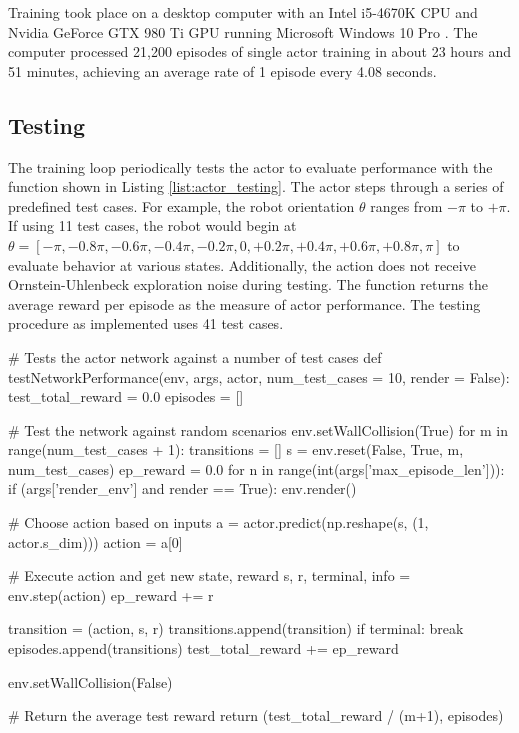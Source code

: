 Training took place on a desktop computer with an Intel i5-4670K CPU and Nvidia GeForce GTX 980 Ti GPU running Microsoft Windows 10 Pro \cite{intel}\cite{980ti}\cite{windows}. The computer processed 21,200 episodes of single actor training in about 23 hours and 51 minutes, achieving an average rate of 1 episode every 4.08 seconds.

\subsection{Testing}
The training loop periodically tests the actor to evaluate performance with the  function shown in Listing \ref{list:actor_testing}. The actor steps through a series of predefined test cases. For example, the robot orientation $\theta$ ranges from $-\pi$ to $+\pi$. If using 11 test cases, the robot would begin at $\theta=[-\pi, -0.8\pi, -0.6\pi, -0.4\pi, -0.2\pi, 0, +0.2\pi, +0.4\pi, +0.6\pi, +0.8\pi, \pi]$ to evaluate behavior at various states. Additionally, the action does not receive Ornstein-Uhlenbeck exploration noise during testing. The function returns the average reward per episode as the measure of actor performance. The testing procedure as implemented uses 41 test cases.
\begin{python}[caption={Actor Testing Function},label={list:actor_testing}]
# Tests the actor network against a number of test cases
def testNetworkPerformance(env, args, actor, num_test_cases = 10, render = False):
    test_total_reward = 0.0
    episodes = []

    # Test the network against random scenarios
    env.setWallCollision(True)
    for m in range(num_test_cases + 1):
        transitions = []
        s = env.reset(False, True, m, num_test_cases)
        ep_reward = 0.0
        for n in range(int(args['max_episode_len'])):
            if (args['render_env'] and render == True):
                env.render()

            # Choose action based on inputs
            a = actor.predict(np.reshape(s, (1, actor.s_dim)))
            action = a[0]

            # Execute action and get new state, reward
            s, r, terminal, info = env.step(action)
            ep_reward += r

            transition = (action, s, r)
            transitions.append(transition)
            if terminal:
                break
        episodes.append(transitions)
        test_total_reward += ep_reward

    env.setWallCollision(False)

    # Return the average test reward
    return (test_total_reward / (m+1), episodes)

\end{python}
%

